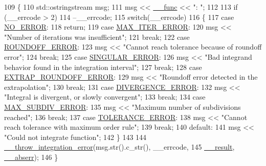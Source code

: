 \begin{DoxyCode}
109     \{
110       std::ostringstream msg;
111       msg << \hyperlink{namespace____gnu__cxx_af2b2f0c7a2ae72b922b1afefae5a65b2}{\_\_func} << \textcolor{stringliteral}{": "};
112 
113       \textcolor{keywordflow}{if} (\_\_errcode > 2)
114         --\_\_errcode;
115       \textcolor{keywordflow}{switch}(\_\_errcode)
116         \{
117         \textcolor{keywordflow}{case} \hyperlink{namespace____gnu__cxx_ad6c62dd86a596716cece6ac2d4cfd4b3ac31eecc280b10dec2efb4a2216ccc2e0}{NO\_ERROR}:
118           \textcolor{keywordflow}{return};
119         \textcolor{keywordflow}{case} \hyperlink{namespace____gnu__cxx_ad6c62dd86a596716cece6ac2d4cfd4b3a420d46d10205dd953d0ccce5323afc4c}{MAX\_ITER\_ERROR}:
120           msg << \textcolor{stringliteral}{"Number of iterations was insufficient"};
121           \textcolor{keywordflow}{break};
122         \textcolor{keywordflow}{case} \hyperlink{namespace____gnu__cxx_ad6c62dd86a596716cece6ac2d4cfd4b3a29574de87143c7715e9a138d7340e8ae}{ROUNDOFF\_ERROR}:
123           msg << \textcolor{stringliteral}{"Cannot reach tolerance because of roundoff error"};
124           \textcolor{keywordflow}{break};
125         \textcolor{keywordflow}{case} \hyperlink{namespace____gnu__cxx_ad6c62dd86a596716cece6ac2d4cfd4b3a8e955ea89d59c116d92f16f345620d04}{SINGULAR\_ERROR}:
126           msg << \textcolor{stringliteral}{"Bad integrand behavior found in the integration interval"};
127           \textcolor{keywordflow}{break};
128         \textcolor{keywordflow}{case} \hyperlink{namespace____gnu__cxx_ad6c62dd86a596716cece6ac2d4cfd4b3ac3b74f0b40291f29a3cb3a188412308b}{EXTRAP\_ROUNDOFF\_ERROR}:
129           msg << \textcolor{stringliteral}{"Roundoff error detected in the extrapolation"};
130           \textcolor{keywordflow}{break};
131         \textcolor{keywordflow}{case} \hyperlink{namespace____gnu__cxx_ad6c62dd86a596716cece6ac2d4cfd4b3a5a36b63b8fa7c921d9332c69416c2686}{DIVERGENCE\_ERROR}:
132           msg << \textcolor{stringliteral}{"Integral is divergent, or slowly convergent"};
133           \textcolor{keywordflow}{break};
134         \textcolor{keywordflow}{case} \hyperlink{namespace____gnu__cxx_ad6c62dd86a596716cece6ac2d4cfd4b3a4c1e6a4f8a49af2eae50e4bf6f93e016}{MAX\_SUBDIV\_ERROR}:
135           msg << \textcolor{stringliteral}{"Maximum number of subdivisions reached"};
136           \textcolor{keywordflow}{break};
137         \textcolor{keywordflow}{case} \hyperlink{namespace____gnu__cxx_ad6c62dd86a596716cece6ac2d4cfd4b3ab7427fd44a0ed217814ca07b9b5aba07}{TOLERANCE\_ERROR}:
138           msg << \textcolor{stringliteral}{"Cannot reach tolerance with maximum order rule"};
139           \textcolor{keywordflow}{break};
140         \textcolor{keywordflow}{default}:
141           msg << \textcolor{stringliteral}{"Could not integrate function"};
142         \}
143 
144       \hyperlink{namespace____gnu__cxx_a2ae22137ca092b8ae10f4d42b4e32cfb}{\_\_throw\_integration\_error}(msg.str().c\_str(), \_\_errcode,
145                                 \hyperlink{namespace____gnu__cxx_a500ea9f53aeaecd8c2ae657503450578}{\_\_result}, \hyperlink{namespace____gnu__cxx_a72f736cff127f1574e91a301de9e074b}{\_\_abserr});
146     \}
\end{DoxyCode}
